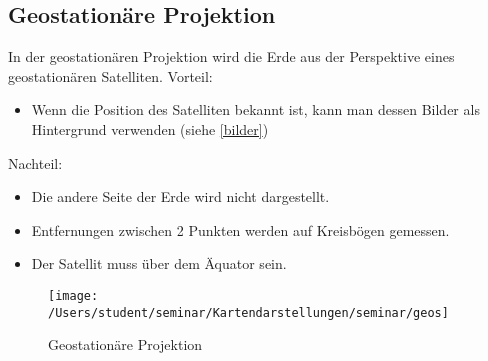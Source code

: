 \subsection{Geostationäre Projektion}
\label{sec:geostat}
In der geostationären Projektion wird die Erde aus der Perspektive eines geostationären Satelliten.
Vorteil:\newline \begin{itemize}
                  \item Wenn die Position des Satelliten bekannt ist, kann man dessen
                  Bilder als Hintergrund verwenden (siehe \ref{bilder})
                 \end{itemize}

Nachteil:\newline \begin{itemize}
                  \item Die andere Seite der Erde wird nicht dargestellt.\\
                  \item Entfernungen zwischen 2 Punkten werden auf Kreisbögen gemessen.\\
                  \item Der Satellit muss über dem Äquator sein.
                 \end{itemize}
\begin{figure}[hbtp]
\centering
\texttt{[image: /Users/student/seminar/Kartendarstellungen/seminar/geos]} \caption{Geostationäre Projektion}
\end{figure}
\newpage 